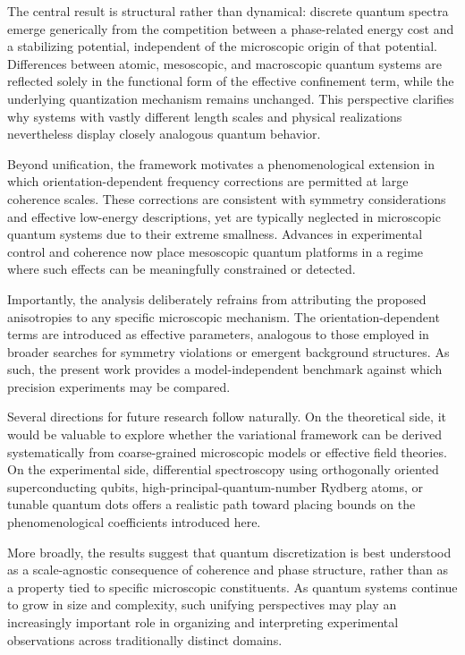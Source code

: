 \documentclass[11pt]{article}
\begin{document}
        The central result is structural rather than dynamical: discrete quantum spectra emerge generically from the competition between a phase-related energy cost and a stabilizing potential, independent of the microscopic origin of that potential. Differences between atomic, mesoscopic, and macroscopic quantum systems are reflected solely in the functional form of the effective confinement term, while the underlying quantization mechanism remains unchanged. This perspective clarifies why systems with vastly different length scales and physical realizations nevertheless display closely analogous quantum behavior.

        Beyond unification, the framework motivates a phenomenological extension in which orientation-dependent frequency corrections are permitted at large coherence scales. These corrections are consistent with symmetry considerations and effective low-energy descriptions, yet are typically neglected in microscopic quantum systems due to their extreme smallness. Advances in experimental control and coherence now place mesoscopic quantum platforms in a regime where such effects can be meaningfully constrained or detected.

        Importantly, the analysis deliberately refrains from attributing the proposed anisotropies to any specific microscopic mechanism. The orientation-dependent terms are introduced as effective parameters, analogous to those employed in broader searches for symmetry violations or emergent background structures. As such, the present work provides a model-independent benchmark against which precision experiments may be compared.

        Several directions for future research follow naturally. On the theoretical side, it would be valuable to explore whether the variational framework can be derived systematically from coarse-grained microscopic models or effective field theories. On the experimental side, differential spectroscopy using orthogonally oriented superconducting qubits, high-principal-quantum-number Rydberg atoms, or tunable quantum dots offers a realistic path toward placing bounds on the phenomenological coefficients introduced here.

        More broadly, the results suggest that quantum discretization is best understood as a scale-agnostic consequence of coherence and phase structure, rather than as a property tied to specific microscopic constituents. As quantum systems continue to grow in size and complexity, such unifying perspectives may play an increasingly important role in organizing and interpreting experimental observations across traditionally distinct domains.
\end{document}
